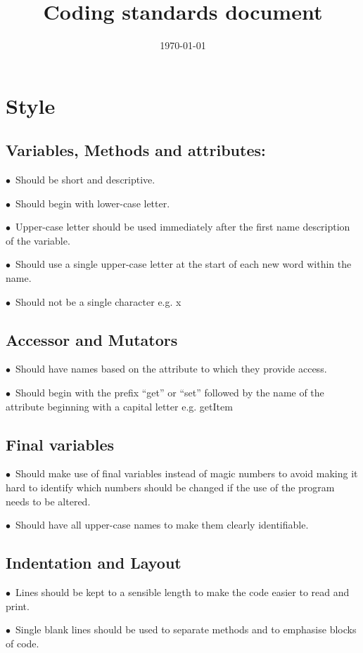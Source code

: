 \documentclass[english]{article}
\title{Coding standards document\\}
\date{\today}
\begin{document}
	\maketitle
	


	\section{Style}
			

		\subsection{Variables, Methods and attributes:}
			$\bullet$\ Should be short and descriptive.\par
			$\bullet$\ Should begin with lower-case letter.\par
$\bullet$\ Upper-case letter should be used immediately after the first name description of the variable.\par
$\bullet$\ Should use a single upper-case letter at the start of each new word within the name.\par
$\bullet$\ Should not be a single character e.g. x \par


                                	

		\subsection{Accessor and Mutators}
$\bullet$\  Should have names based on the attribute to which they provide access.\par
$\bullet$\ Should begin with the prefix “get” or “set” followed by the name of the attribute beginning with a capital letter e.g. getItem \par

		\subsection{Final variables}
		$\bullet$\ Should make use of final variables instead of magic numbers to avoid making it hard to identify which numbers should be changed if the use of the program needs to be altered.\par
			$\bullet$\ Should have all upper-case names to make them clearly identifiable.\par		
				
				
		\subsection{Indentation and Layout}
$\bullet$\ Lines should be kept to a sensible length to make the code easier to read and print.\par	
	$\bullet$\ Single blank lines should be used to separate methods and to emphasise blocks of code.\par	
		
\end{document}
